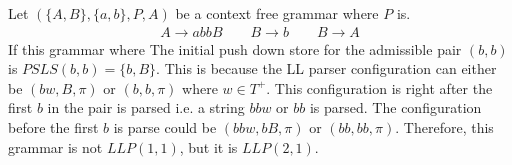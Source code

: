 \begin{example}
    Let $(\{A, B\}, \{a, b\}, P, A)$ be a context free grammar where $P$ is.
    \begin{gather*}
        A \to a b b B \qquad B \to b \qquad B \to A
    \end{gather*}
    If this grammar where 
    The initial push down store for the admissible pair $(b, b)$ is $PSLS(b, b) = \{b, B\}$. This is because the LL parser configuration can either be $(bw, B, \pi)$ or $(b, b, \pi)$ where $w \in T^+$. This configuration is right after the first $b$ in the pair is parsed i.e. a string $bbw$ or $bb$ is parsed. The configuration before the first $b$ is parse could be $(bbw, bB, \pi)$ or $(bb, bb, \pi)$. Therefore, this grammar is not $LLP(1, 1)$, but it is $LLP(2, 1)$.
\end{example}